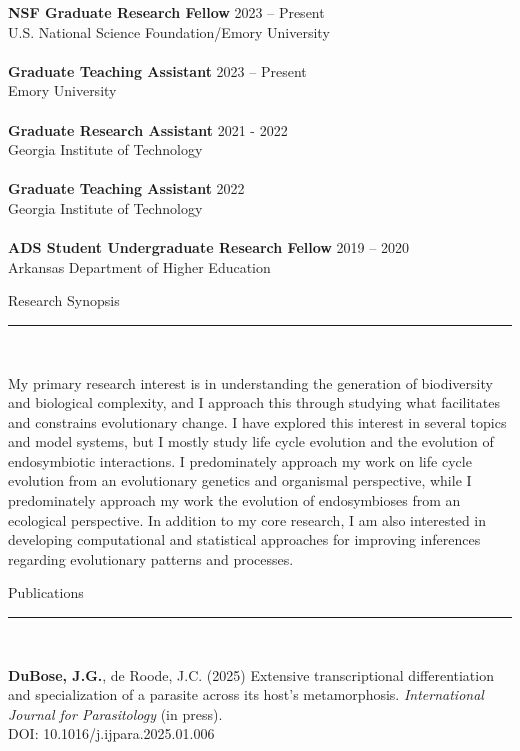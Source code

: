 \documentclass{article}
\begin{document}
\textbf{NSF Graduate Research Fellow} \hfill 2023 – Present \\
U.S. National Science Foundation/Emory University
\\
\\
\textbf{Graduate Teaching Assistant} \hfill 2023 – Present \\
Emory University
\\
\\
\textbf{Graduate Research Assistant} \hfill 2021 - 2022 \\
Georgia Institute of Technology
\\
\\
\textbf{Graduate Teaching Assistant} \hfill 2022 \\
Georgia Institute of Technology
\\
\\
\textbf{ADS Student Undergraduate Research Fellow} \hfill 2019 – 2020 \\
Arkansas Department of Higher Education
\\
\begin{flushleft}
{\Large Research Synopsis} \rule{16.51cm}{0.4pt}\\
\end{flushleft}
My primary research interest is in understanding the generation of biodiversity and biological complexity,
and I approach this through studying what facilitates and constrains evolutionary change. I have explored
this interest in several topics and model systems, but I mostly study life cycle evolution and the evolution 
of endosymbiotic interactions. I predominately approach my work on life cycle evolution from an 
evolutionary genetics and organismal perspective, while I predominately approach my work the evolution
of endosymbioses from an ecological perspective. In addition to my core research, I am also interested in 
developing computational and statistical approaches for improving inferences regarding evolutionary patterns 
and processes. 
\\

\pagebreak

\begin{flushleft}
{\Large Publications} \rule{16.51cm}{0.4pt}\\
\end{flushleft}

\hangindent=0.7cm \textbf{DuBose, J.G.}, de Roode, J.C. (2025) Extensive transcriptional differentiation and specialization of a parasite across its host's metamorphosis. \emph{International Journal for Parasitology} (in press). \\
DOI: 10.1016/j.ijpara.2025.01.006 \\
\end{document}
